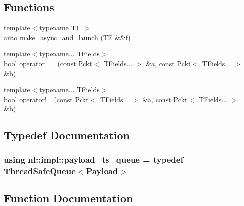 \subsection*{Functions}
\begin{DoxyCompactItemize}
\item 
{\footnotesize template$<$typename T\+F $>$ }\\auto \hyperlink{namespacenl_1_1impl_aac497e0aa1e633bf752b4a166641b015}{make\+\_\+async\+\_\+and\+\_\+launch} (T\+F \&\&f)
\item 
{\footnotesize template$<$typename... T\+Fields$>$ }\\bool \hyperlink{namespacenl_1_1impl_a4f18182ba9a78970fc4e61e0fb6f2598}{operator==} (const \hyperlink{structnl_1_1impl_1_1Pckt}{Pckt}$<$ T\+Fields... $>$ \&a, const \hyperlink{structnl_1_1impl_1_1Pckt}{Pckt}$<$ T\+Fields... $>$ \&b)
\item 
{\footnotesize template$<$typename... T\+Fields$>$ }\\bool \hyperlink{namespacenl_1_1impl_a12c62560f5b5700b0129e85c1761b1ec}{operator!=} (const \hyperlink{structnl_1_1impl_1_1Pckt}{Pckt}$<$ T\+Fields... $>$ \&a, const \hyperlink{structnl_1_1impl_1_1Pckt}{Pckt}$<$ T\+Fields... $>$ \&b)
\end{DoxyCompactItemize}


\subsection{Typedef Documentation}
\hypertarget{namespacenl_1_1impl_ac6b1869f59942ec428df8880f4c20855}{}
\subsubsection[{payload\+\_\+ts\+\_\+queue}]{\setlength{\rightskip}{0pt plus 5cm}using {\bf nl\+::impl\+::payload\+\_\+ts\+\_\+queue} = typedef {\bf Thread\+Safe\+Queue}$<${\bf Payload}$>$}\label{namespacenl_1_1impl_ac6b1869f59942ec428df8880f4c20855}


\subsection{Function Documentation}
\hypertarget{namespacenl_1_1impl_aac497e0aa1e633bf752b4a166641b015}{}
